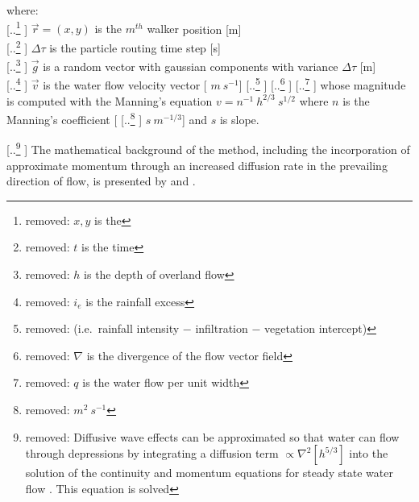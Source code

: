 \documentclass[gmd, manuscript]{copernicus}
\providecommand{\DIFadd}[1]{{\protect\color{blue} \sf #1}} %
\providecommand{\DIFdel}[1]{{\protect\color{red} [..\footnote{removed: #1} ]}} %
\providecommand{\DIFaddbegin}{} %
\providecommand{\DIFaddend}{} %
\providecommand{\DIFdelbegin}{} %
\providecommand{\DIFdelend}{} %
\begin{document}
\DIFaddend {\small
\noindent
where: \\
\noindent
\hspace*{0.5em} \DIFdelbegin \DIFdel{$x, y$ is the }\DIFdelend \DIFaddbegin \DIFadd{$\vec{r} = (x, y)$ is the $m^{th}$ walker }\DIFaddend position [\unit{m}]\\
\hspace*{0.5em} \DIFdelbegin \DIFdel{$t$ is the time }\DIFdelend \DIFaddbegin \DIFadd{$\Delta \tau$ is the particle routing time step }\DIFaddend [\unit{s}]\\
\hspace*{0.5em} \DIFdelbegin \DIFdel{$h$ is the depth of overland flow }\DIFdelend \DIFaddbegin \DIFadd{$\vec{g}$ is a random vector with gaussian components with variance $\Delta \tau$ }\DIFaddend [\unit{m}]\\
\hspace*{0.5em} \DIFdelbegin \DIFdel{$i_e$ is the rainfall excess }\DIFdelend \DIFaddbegin \DIFadd{$\vec{v} $ is the water flow velocity vector }\DIFaddend [\DIFdelbegin %
\DIFdelend \DIFaddbegin \DIFadd{$\unit{m~s^{-1}}$}\DIFaddend ]
\DIFdelbegin %
\DIFdel{\hspace*{0.5em} (i.e.~rainfall intensity $-$ infiltration $-$ vegetation intercept)}%
\DIFdel{\hspace*{0.5em} $\nabla$ is the divergence of the flow vector field}%
\DIFdel{\hspace*{0.5em} $q$ is the water flow per unit width }\DIFdelend \DIFaddbegin \DIFadd{whose magnitude is computed with the Manning's equation $v=n^{-1}~h^{2/3}~s^{1/2}$ 
where $n$ is the Manning's coefficient }\DIFaddend [\DIFdelbegin \DIFdel{$\unit{m}^2~\unit{s}^{-1}$}\DIFdelend \DIFaddbegin \DIFadd{$\unit{s~m^{-1/3}}$}\DIFaddend ] \DIFaddbegin \DIFadd{and $s$ is slope}\DIFaddend .\\ 
}
\DIFdelbegin %

\DIFdelend %
\noindent
\DIFdelbegin \DIFdel{Diffusive wave effects can be approximated
so that water can flow through depressions 
by integrating a diffusion term 
$ \propto \nabla^2 [h^{5/3}]$
into the solution of the continuity and momentum equations 
for steady state water flow .
This equation
is solved }\DIFdelend \DIFaddbegin \DIFadd{The mathematical background of the method,
including the incorporation of approximate momentum 
through an increased diffusion rate in the prevailing direction of flow,
is presented by \cite{Mitas1998} and \cite{Mitasova2004}.
}
\end{document}
